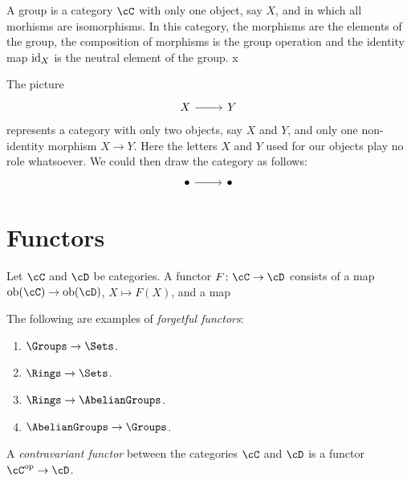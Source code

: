 \begin{example}
    A group is a category $\cC$ with only one object, say $X$, 
    and in which all morhisms are isomorphisms. In this category, 
    the morphisms are the elements of the group,  the composition
    of morphisms is the group operation and the identity map
    $\operatorname{id}_X$ is the neutral element of the group. 
x\end{example}

\begin{example}
The picture 
\[\begin{tikzcd}
	X & Y
	\arrow[from=1-1, to=1-2]
\end{tikzcd}\]
represents a category with only two objects, say $X$ and $Y$, 
and only one
non-identity morphism $X\to Y$. Here the letters $X$ and $Y$ 
used for
our objects play no role whatsoever. We could then 
draw the category as follows:
\[\begin{tikzcd}
	\bullet & \bullet
	\arrow[from=1-1, to=1-2]
\end{tikzcd}\]
\end{example}

\section{Functors}

\begin{definition}
    Let $\cC$ and $\cD$ be categories. A functor $F\colon\cC\to\cD$ 
    consists of a map 
    $\operatorname{ob}(\cC)\to\operatorname{ob}(\cD)$, $X\mapsto F(X)$, and 
    a map 
\end{definition}

\begin{example}
    The following are examples of \emph{forgetful functors}:
    \begin{enumerate}
        \item $\Groups\to\Sets$.
        \item $\Rings\to\Sets$.
        \item $\Rings\to\AbelianGroups$.
        \item $\AbelianGroups\to\Groups$. 
    \end{enumerate}
\end{example}

\begin{definition}
    A \emph{contravariant functor} between 
    the categories $\cC$ and $\cD$ is 
    a functor $\cC^{\op}\to\cD$. 
\end{definition}

